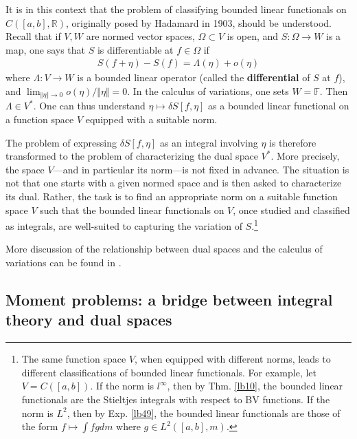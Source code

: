 \documentclass[12pt,b5paper,notitlepage]{article}
\theoremstyle{definition}
\theoremstyle{plain}
\newcommand{\Rbb}{\mathbb R}
\newcommand{\Fbb}{\mathbb F}
\numberwithin{equation}{section}
\begin{document}
It is in this context that the problem of classifying bounded linear functionals on $C([a,b],\Rbb)$, originally posed by Hadamard in 1903, should be understood. Recall that if $V,W$ are normed vector spaces, $\Omega\subset V$ is open, and $S:\Omega\rightarrow W$ is a map, one says that $S$ is differentiable at $f\in\Omega$ if 
\begin{align*}
S(f+\eta)-S(f)=\Lambda(\eta)+o(\eta)
\end{align*}
where $\Lambda:V\rightarrow W$ is a bounded linear operator (called the \textbf{differential} of $S$ at $f$), and $\lim_{\Vert\eta\Vert\rightarrow0}o(\eta)/\Vert\eta\Vert=0$. In the calculus of variations, one sets $W=\Fbb$. Then $\Lambda\in V^*$. One can thus understand $\eta\mapsto\delta S[f,\eta]$ as a bounded linear functional on a function space $V$ equipped with a suitable norm.



The problem of expressing $\delta S[f,\eta]$ as an integral involving $\eta$ is therefore transformed to the problem of characterizing the dual space $V^*$. More precisely, the space $V$---and in particular its norm---is not fixed in advance. The situation is not that one starts with a given normed space and is then asked to characterize its dual. Rather, the task is to find an appropriate norm on a suitable function space $V$ such that the bounded linear functionals on $V$, once studied and classified as integrals, are well-suited to capturing the variation of $S$.\footnote{The same function space $V$, when equipped with different norms, leads to different classifications of bounded linear functionals. For example, let $V=C([a,b])$. If the norm is $l^\infty$, then by Thm. \ref{lb10}, the bounded linear functionals are the Stieltjes integrals with respect to BV functions. If the norm is $L^2$, then by Exp. \ref{lb49}, the bounded linear functionals are those of the form $f\mapsto\int fgdm$ where $g\in L^2([a,b],m)$.} 

More discussion of the relationship between dual spaces and the calculus of variations can be found in \cite{Gray84}.


\subsection{Moment problems: a bridge between integral theory and dual spaces}\label{lb41}
\end{document}
